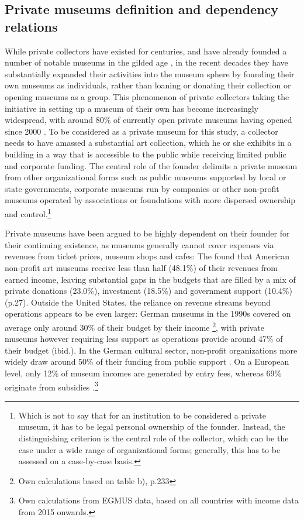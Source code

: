 \documentclass[12pt]{article}
\begin{document}
\subsection*{Private museums definition and dependency relations}






While private collectors have existed for centuries, and have already founded a number of notable museums in the gilded age \parencite{Higonnet_2003_sight,Duncan_1995_civilizing}, in the recent decades they have substantially expanded their activities into the museum sphere by founding their own museums as individuals, rather than loaning or donating their collection or opening museums as a group.
This phenomenon of private collectors taking the initiative in setting up a museum of their own has become increasingly widespread, with around 80\% of currently open private museums having opened since 2000 \parencite{Velthuis_etal_2023_boom}.
To be considered as a private museum for this study, a collector needs to have amassed a substantial art collection, which he or she exhibits in a building in a way that is accessible to the public while receiving limited public and corporate funding.
The central role of the founder delimits a private museum from other organizational forms such as public museums supported by local or state governments, corporate museums run by companies or other non-profit museums operated by associations or foundations with more dispersed ownership and control.\footnote{Which is not to say that for an institution to be considered a private museum, it has to be legal personal ownership of the founder. Instead, the distinguishing criterion is the central role of the collector, which can be the case under a wide range of organizational forms; generally, this has to be assessed on a case-by-case basis.}



Private museums have been argued to be highly dependent on their founder for their continuing existence, as museums generally cannot cover expenses via revenues from ticket prices, museum shops and cafes:
The \textcite{IMLS_2008_funding} found that American non-profit art museums receive less than half (48.1\%) of their revenues from earned income, leaving substantial gaps in the budgets that are filled by a mix of private donations (23.0\%), investment (18.5\%) and government support (10.4\%) (p.27).
Outside the United States, the reliance on revenue streams beyond operations appears to be even larger:
German museums in the 1990s covered on average only around 30\% of their budget by their income \parencite{Martin_1993_museen}\footnote{Own calculations based on table b), p.233}, with private museums however requiring less support as operations provide around 47\% of their budget (ibid.).
In the German cultural sector, non-profit organizations more widely draw around 50\% of their funding from public support \parencite[p.82]{Zimmer_Priller_2007_gemeinnuetzig}.
On a European level, only 12\% of museum incomes are generated by entry fees, whereas 69\% originate from subsidies \parencite{EGMUS_2024_complete}.\footnote{Own calculations from EGMUS data, based on all countries with income data from 2015 onwards.}
\end{document}
